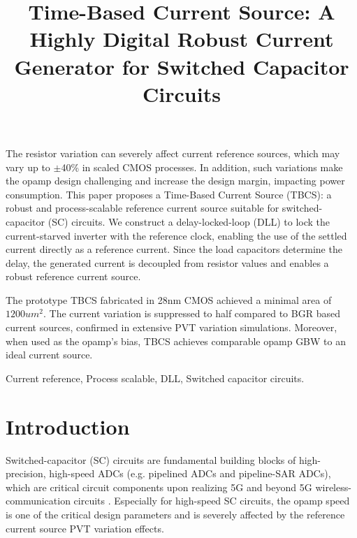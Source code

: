 \documentclass[paper]{ieice}
\title{\LARGE \bf
Time-Based Current Source: A Highly Digital Robust Current Generator for Switched Capacitor Circuits
}
\begin{document}
\maketitle
\thispagestyle{empty}
\pagestyle{empty}

\begin{summary}
The resistor variation can severely affect current reference sources, which may vary up to $\pm$40\% in scaled CMOS processes. In addition, such variations make the opamp design challenging and increase the design margin, impacting power consumption.
This paper proposes a Time-Based Current Source (TBCS): a robust and process-scalable reference current source suitable for switched-capacitor (SC) circuits.
We construct a delay-locked-loop (DLL) to lock the current-starved inverter with the reference clock, enabling the use of the settled current directly as a reference current.
Since the load capacitors determine the delay, the generated current is decoupled from resistor values and enables a robust reference current source. 

The prototype TBCS fabricated in 28nm CMOS achieved a minimal area of $1200um^2$. The current variation is suppressed to half compared to BGR based current sources, confirmed in extensive PVT variation simulations. Moreover, when used as the opamp's bias, TBCS achieves comparable opamp GBW to an ideal current source.

\end{summary}
\begin{keywords}
Current reference, Process scalable, DLL, Switched capacitor circuits.
\end{keywords}

\section{Introduction}

\qquad Switched-capacitor (SC) circuits are fundamental building blocks of high-precision, high-speed ADCs (e.g. pipelined ADCs and pipeline-SAR ADCs), which are critical circuit components upon realizing 5G and beyond 5G wireless-communication circuits \cite{5g1, 5g2, ali201414, ali202012, lagos2018single, hung2020calibration}. Especially for high-speed SC circuits, the opamp speed is one of the critical design parameters and is severely affected by the reference current source PVT variation effects.
\end{document}
